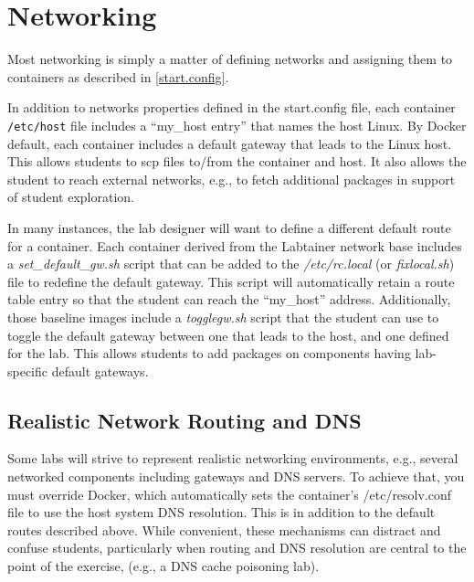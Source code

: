 \documentclass[12pt]{article}
\begin{document}
\section{Networking}
Most networking is simply a matter of defining networks and assigning them to containers
as described in \ref{start.config}.  

In addition to networks properties defined in the
start.config file, each container \texttt{/etc/host} file includes a ``my\_host entry'' that names
the host Linux.  By Docker default, each container includes a default gateway that
leads to the Linux host.  This allows students to scp files to/from the container and host.
It also allows the student to reach external networks, e.g., to fetch additional packages in
support of student exploration.

In many instances, the lab designer will want to define a different default route for a 
container.  Each container derived from the Labtainer network base includes a \textit{set\_default\_gw.sh}
script that can be added to the \textit{/etc/rc.local} (or \textit{fixlocal.sh}) file to redefine the default gateway.
This script will automatically retain a route table entry so that the student can reach the ``my\_host''
address.  Additionally, those baseline images include a \textit{togglegw.sh} script that the student
can use to toggle the default gateway between one that leads to the host, and one defined for the lab.
This allows students to add packages on components having lab-specific default gateways.

\subsection{Realistic Network Routing and DNS}
Some labs will strive to represent realistic networking environments, 
e.g., several networked components including gateways and DNS servers.
To achieve that, you must override Docker, which automatically sets 
the container's /etc/resolv.conf file to use the
host system DNS resolution.  This is in addition to the default routes described
above.  While convenient, these mechanisms can distract and confuse students, particularly
when routing and DNS resolution are central to the point of the exercise, (e.g.,
a DNS cache poisoning lab).
\end{document}
